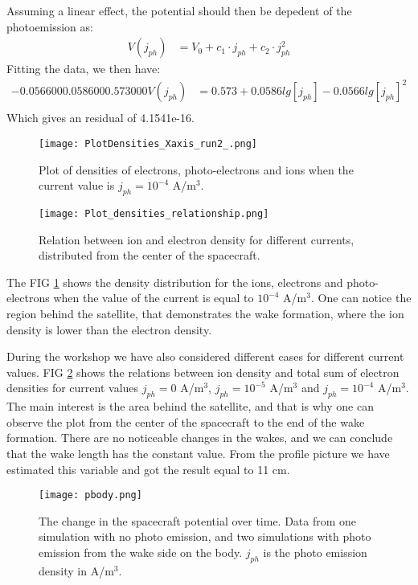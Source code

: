 \documentclass[aip, 
rsi, 
amsmath,
amssymb,
longbibliography,
preprint]{revtex4-1}
\begin{document}
Assuming a linear effect, the potential should then be depedent of the photoemission as:
\begin{align*}
V\left(j_{ph}\right) &= V_0 + c_1\cdot j_{ph} + c_2\cdot j_{ph}^2
\end{align*}
Fitting the data, we then have:
\begin{align*}
 -0.056600   0.058600   0.573000
V\left(j_{ph}\right) &= 0.573 + 0.0586 lg\left[j_{ph}\right] - 0.0566 lg\left[j_{ph}\right]^2\\
\end{align*}
Which gives an residual of 4.1541e-16.

\begin{figure}
\texttt{[image: PlotDensities\_Xaxis\_run2\_.png]}
\caption{\label{fig:densityCurrent}Plot of densities of electrons, photo-electrons and ions when the current value is \(j_{ph} = 10^{-4}\) A/m$^3$.}
\end{figure}

\begin{figure}
\texttt{[image: Plot\_densities\_relationship.png]}
\caption{\label{fig:densityCurrentRelation}Relation between ion and electron density for different currents, distributed from the center of the spacecraft.}
\end{figure}

The FIG \ref{fig:densityCurrent} shows the density distribution for the ions, electrons and photo-electrons when the value of the current is equal to $10^{-4}$ A/m$^3$. One can notice the region behind the satellite, that demonstrates the wake formation, where the ion density is lower than the electron density.\par

During the workshop we have also considered different cases for different current values. FIG \ref{fig:densityCurrentRelation} shows the relations between ion density and total sum of electron densities for current values $j_{ph}=0$ A/m$^3$, $j_{ph}=10^{-5}$ A/m$^3$ and $j_{ph}=10^{-4}$ A/m$^3$. The main interest is the area behind the satellite, and that is why one can observe the plot from the center of the spacecraft to the end of the wake formation. There are no noticeable changes in the wakes, and we can conclude that the wake length has the constant value. From the profile picture we have estimated this variable and got the result equal to 11 cm.

\begin{figure*}
\texttt{[image: pbody.png]}
\caption{The change in the spacecraft potential over time. Data from one simulation with no photo emission, and two simulations with photo emission from the wake side on the body. $j_{ph}$ is the photo emission density in A/m$^3$. \label{fig:potential_time}}
\end{figure*}
\end{document}
